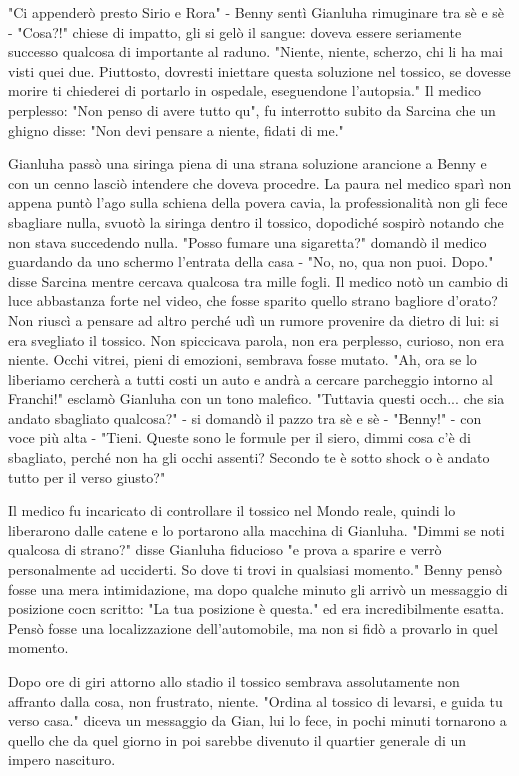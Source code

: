 "Ci appenderò presto Sirio e Rora" - Benny sentì Gianluha rimuginare tra sè e sè - "Cosa?!" chiese di impatto, gli si gelò il sangue: doveva essere seriamente successo qualcosa di importante al raduno. "Niente, niente, scherzo, chi li ha mai visti quei due. Piuttosto, dovresti iniettare questa soluzione nel tossico, se dovesse morire ti chiederei di portarlo in ospedale, eseguendone l'autopsia."
Il medico perplesso: "Non penso di avere tutto qu", fu interrotto subito da Sarcina che un ghigno disse: "Non devi pensare a niente, fidati di me."

Gianluha passò una siringa piena di una strana soluzione arancione a Benny e con un cenno lasciò intendere che doveva procedre. La paura nel medico sparì non appena puntò l'ago sulla schiena della povera cavia, la professionalità non gli fece sbagliare nulla, svuotò la siringa dentro il tossico, dopodiché sospirò notando che non stava succedendo nulla. "Posso fumare una sigaretta?" domandò il medico guardando da uno schermo l'entrata della casa - "No, no, qua non puoi. Dopo." disse Sarcina mentre cercava qualcosa tra mille fogli. 
Il medico notò un cambio di luce abbastanza forte nel video, che fosse sparito quello strano bagliore d'orato?
Non riuscì a pensare ad altro perché udì un rumore provenire da dietro di lui: si era svegliato il tossico. Non spiccicava parola, non era perplesso, curioso, non era niente. Occhi vitrei, pieni di emozioni, sembrava fosse mutato. "Ah, ora se lo liberiamo cercherà a tutti costi un auto e andrà a cercare parcheggio intorno al Franchi!" esclamò Gianluha con un tono malefico.
"Tuttavia questi occh... che sia andato sbagliato qualcosa?" - si domandò il pazzo tra sè e sè - "Benny!" - con voce più alta - "Tieni. Queste sono le formule per il siero, dimmi cosa c'è di sbagliato, perché non ha gli occhi assenti? Secondo te è sotto shock o è andato tutto per il verso giusto?"

Il medico fu incaricato di controllare il tossico nel Mondo reale, quindi lo liberarono dalle catene e lo portarono alla macchina di Gianluha. "Dimmi se noti qualcosa di strano?" disse Gianluha fiducioso "e prova a sparire e verrò personalmente ad ucciderti. So dove ti trovi in qualsiasi momento."
Benny pensò fosse una mera intimidazione, ma dopo qualche minuto gli arrivò un messaggio di posizione cocn scritto: "La tua posizione è questa." ed era incredibilmente esatta. Pensò fosse una localizzazione dell'automobile, ma non si fidò a provarlo in quel momento.

Dopo ore di giri attorno allo stadio il tossico sembrava assolutamente non affranto dalla cosa, non frustrato, niente. "Ordina al tossico di levarsi, e guida tu verso casa." diceva un messaggio da Gian, lui lo fece, in pochi minuti tornarono a quello che da quel giorno in poi sarebbe divenuto il quartier generale di un impero nascituro.

